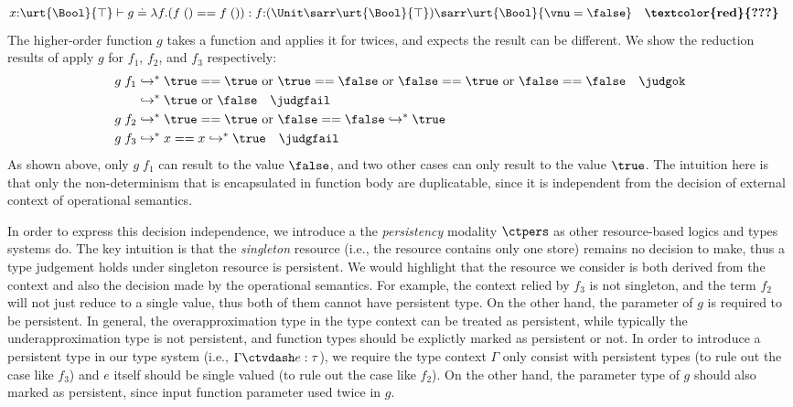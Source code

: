 \begin{align*}
  &x{:}\urt{\Bool}{\top} \vdash g \doteq \lambda f.(f\;() == f\;()) : f{:}(\Unit\sarr\urt{\Bool}{\top})\sarr\urt{\Bool}{\vnu = \false} \quad \textbf{\textcolor{red}{???}}
\end{align*}
The higher-order function $g$ takes a function and applies it for twices, and expects the result can be different. We show the reduction results of apply $g$ for $f_1$, $f_2$, and $f_3$ respectively:
\begin{align*}
  g\;f_1 &\hookrightarrow^* \true == \true \text{  or  } \true == \false \text{  or  } \false == \true \text{  or  } \false == \false \quad \judgok
  \\&\hookrightarrow^* \true \text{  or  } \false \quad \judgfail
  \\g\;f_2 &\hookrightarrow^* \true == \true \text{  or  } \false == \false \hookrightarrow^* \true
  \\g\;f_3 &\hookrightarrow^* x == x \hookrightarrow^* \true \quad \judgfail
\end{align*}
As shown above, only $g\;f_1$ can result to the value $\false$, and two other cases can only result to the value $\true$. The intuition here is that only the non-determinism that is encapsulated in function body are duplicatable, since it is independent from the decision of external context of operational semantics.

In order to express this decision independence, we introduce a the \emph{persistency} modality $\ctpers$ as other resource-based logics and types systems do. The key intuition is that the \emph{singleton} resource (i.e., the resource contains only one store) remains no decision to make, thus a type judgement holds under singleton resource is persistent. We would highlight that the resource we consider is both derived from the context and also the decision made by the operational semantics. For example, the context relied by $f_3$ is not singleton, and the term $f_2$ will not just reduce to a single value, thus both of them cannot have persistent type. On the other hand, the parameter of $g$ is required to be persistent. In general, the overapproximation type in the type context can be treated as persistent, while typically the underapproximation type is not persistent, and function types should be explictly marked as persistent or not.
In order to introduce a persistent type in our type system (i.e., $\Gamma \ctvdash e : \tau$), we require the type context $\Gamma$ only consist with persistent types (to rule out the case like $f_3$) and $e$ itself should be single valued (to rule out the case like $f_2$).
On the other hand, the parameter type of $g$ should also marked as persistent, since input function parameter used twice in $g$.

